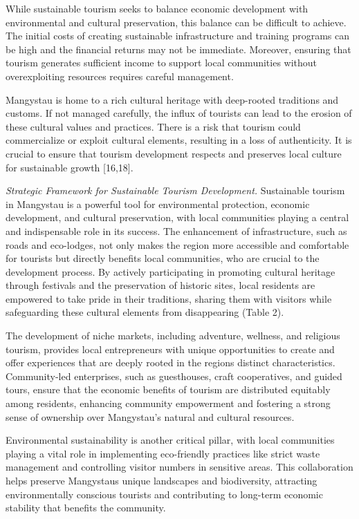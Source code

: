 \begin{multicols}{2}
While sustainable tourism seeks to balance economic development with
environmental and cultural preservation, this balance can be difficult
to achieve. The initial costs of creating sustainable infrastructure and
training programs can be high and the financial returns may not be
immediate. Moreover, ensuring that tourism generates sufficient income
to support local communities without overexploiting resources requires
careful management.

Mangystau is home to a rich cultural heritage with deep-rooted
traditions and customs. If not managed carefully, the influx of tourists
can lead to the erosion of these cultural values and practices. There is
a risk that tourism could commercialize or exploit cultural elements,
resulting in a loss of authenticity. It is crucial to ensure that
tourism development respects and preserves local culture for sustainable
growth {[}16,18{]}.

\emph{Strategic Framework for Sustainable Tourism Development.}
Sustainable tourism in Mangystau is a powerful tool for environmental
protection, economic development, and cultural preservation, with local
communities playing a central and indispensable role in its success. The
enhancement of infrastructure, such as roads and eco-lodges, not only
makes the region more accessible and comfortable for tourists but
directly benefits local communities, who are crucial to the development
process. By actively participating in promoting cultural heritage
through festivals and the preservation of historic sites, local
residents are empowered to take pride in their traditions, sharing them
with visitors while safeguarding these cultural elements from
disappearing (Table 2).

The development of niche markets, including adventure, wellness, and
religious tourism, provides local entrepreneurs with unique
opportunities to create and offer experiences that are deeply rooted in
the region\textquotesingle s distinct characteristics. Community-led
enterprises, such as guesthouses, craft cooperatives, and guided tours,
ensure that the economic benefits of tourism are distributed equitably
among residents, enhancing community empowerment and fostering a strong
sense of ownership over Mangystau's natural and cultural resources.

Environmental sustainability is another critical pillar, with local
communities playing a vital role in implementing eco-friendly practices
like strict waste management and controlling visitor numbers in
sensitive areas. This collaboration helps preserve
Mangystau\textquotesingle s unique landscapes and biodiversity,
attracting environmentally conscious tourists and contributing to
long-term economic stability that benefits the community.


\end{multicols}
